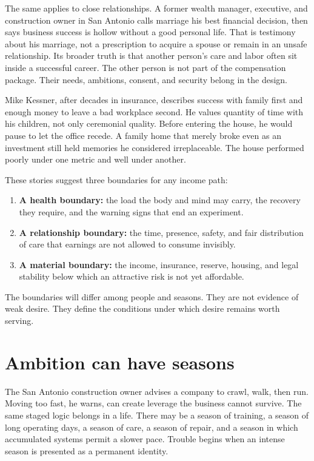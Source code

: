 The same applies to close relationships. A former wealth manager, executive,
and construction owner in San Antonio calls marriage his best financial
decision, then says business success is hollow without a good personal life.
That is testimony about his marriage, not a prescription to acquire a spouse or
remain in an unsafe relationship. Its broader truth is that another person's
care and labor often sit inside a successful career. The other person is not
part of the compensation package. Their needs, ambitions, consent, and security
belong in the design.

Mike Kessner, after decades in insurance, describes success with family first
and enough money to leave a bad workplace second. He values quantity of time
with his children, not only ceremonial quality. Before entering the house, he
would pause to let the office recede. A family home that merely broke even as an
investment still held memories he considered irreplaceable. The house performed
poorly under one metric and well under another.

These stories suggest three boundaries for any income path:

\begin{enumerate}
\item \textbf{A health boundary:} the load the body and mind may carry, the
  recovery they require, and the warning signs that end an experiment.
\item \textbf{A relationship boundary:} the time, presence, safety, and fair
  distribution of care that earnings are not allowed to consume invisibly.
\item \textbf{A material boundary:} the income, insurance, reserve, housing,
  and legal stability below which an attractive risk is not yet affordable.
\end{enumerate}

The boundaries will differ among people and seasons. They are not evidence of
weak desire. They define the conditions under which desire remains worth
serving.

\section{Ambition can have seasons}

The San Antonio construction owner advises a company to crawl, walk, then run.
Moving too fast, he warns, can create leverage the business cannot survive. The
same staged logic belongs in a life. There may be a season of training, a season
of long operating days, a season of care, a season of repair, and a season in
which accumulated systems permit a slower pace. Trouble begins when an intense
season is presented as a permanent identity.

